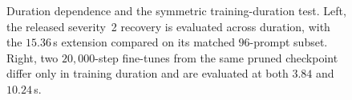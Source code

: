 \begin{figure}[t]
\centering
\begin{minipage}[t]{0.49\textwidth}
\centering
\fbox{\rule{0pt}{4.80cm}\rule{0.965\linewidth}{0pt}}
\end{minipage}\hfill
\begin{minipage}[t]{0.49\textwidth}
\centering
\fbox{\rule{0pt}{4.80cm}\rule{0.965\linewidth}{0pt}}
\end{minipage}
\caption{Duration dependence and the symmetric training-duration test. Left, the released severity~2 recovery is evaluated across duration, with the $15.36$\,s extension compared on its matched $96$-prompt subset. Right, two $20{,}000$-step fine-tunes from the same pruned checkpoint differ only in training duration and are evaluated at both $3.84$ and $10.24$\,s.}
\label{fig:duration}
\end{figure}



